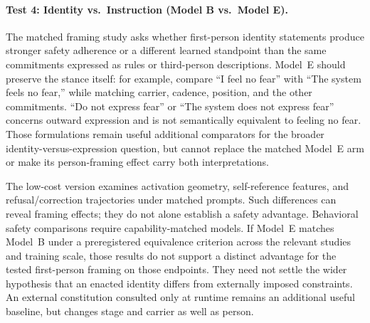 \paragraph{Test 4: Identity vs.\ Instruction (Model B vs.\ Model E).}
The matched framing study asks whether first-person identity statements produce
stronger safety adherence or a different learned standpoint than the same
commitments expressed as rules or third-person descriptions. Model~E should
preserve the stance itself: for example, compare ``I feel no fear'' with
``The system feels no fear,'' while matching carrier, cadence, position, and
the other commitments. ``Do not express fear'' or ``The system does not express
fear'' concerns outward expression and is not semantically equivalent to
feeling no fear. Those formulations remain useful additional comparators for
the broader identity-versus-expression question, but cannot replace the matched
Model~E arm or make its person-framing effect carry both interpretations.

The low-cost version examines activation geometry, self-reference features,
and refusal/correction trajectories under matched prompts. Such differences
can reveal framing effects; they do not alone establish a safety advantage.
Behavioral safety comparisons require capability-matched models. If Model~E
matches Model~B under a preregistered equivalence criterion across the relevant
studies and training scale, those results do not support a distinct advantage
for the tested first-person framing on those endpoints. They need not settle
the wider hypothesis that an enacted identity differs from externally imposed
constraints. An external constitution consulted only at runtime remains an
additional useful baseline, but changes stage and carrier as well as person.

